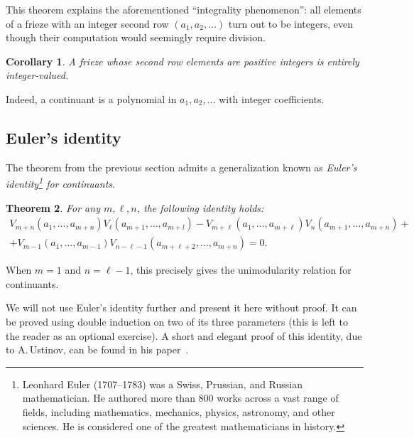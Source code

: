 \documentclass[a4paper,11pt]{amsart}
\theoremstyle{plain}
\newtheorem{theorem}{Theorem}[section]
\newtheorem{corollary}[theorem]{Corollary}
\theoremstyle{remark}
\theoremstyle{definition}
\numberwithin{equation}{section}
\numberwithin{figure}{section}
\begin{document}
This theorem explains the aforementioned ``integrality phenomenon'': all elements of a frieze with an integer second row $(a_1,a_2,\dots)$ turn out to be integers, even though their computation would seemingly require division.

\begin{corollary}
    A frieze whose second row elements are positive integers is entirely integer-valued.
\end{corollary}

Indeed, a continuant is a polynomial in $a_1,a_2,\dots$ with integer coefficients.

\subsection{Euler's identity}The theorem from the previous section admits a generalization known as \emph{Euler's identity\footnote{Leonhard Euler (1707–1783) was a Swiss, Prussian, and Russian mathematician. He authored more than 800 works across a vast range of fields, including mathematics, mechanics, physics, astronomy, and other sciences. He is considered one of the greatest mathematicians in history.} for continuants}.

\begin{theorem}\label{thm:euler}
    For any $m,\ell,n$, the following identity holds:
\begin{multline*}
V_{m+n}(a_1,\dots,a_{m+n})V_\ell(a_{m+1},\dots,a_{m+l})-V_{m+\ell}(a_1,\dots,a_{m+\ell})V_{n}(a_{m+1},\dots,a_{m+n})+\\
+V_{m-1}(a_1,\dots,a_{m-1})V_{n-\ell-1}(a_{m+\ell+2},\dots,a_{m+n})=0.
\end{multline*}
\end{theorem}

When $m=1$ and $n=\ell-1$, this precisely gives the unimodularity relation for continuants.

We will not use Euler's identity further and present it here without proof. It can be proved using double induction on two of its three parameters (this is left to the reader as an optional exercise). A short and elegant proof of this identity, due to A.\,Ustinov, can be found in his paper~\cite{Ustinov06}.
\bigskip
\end{document}

